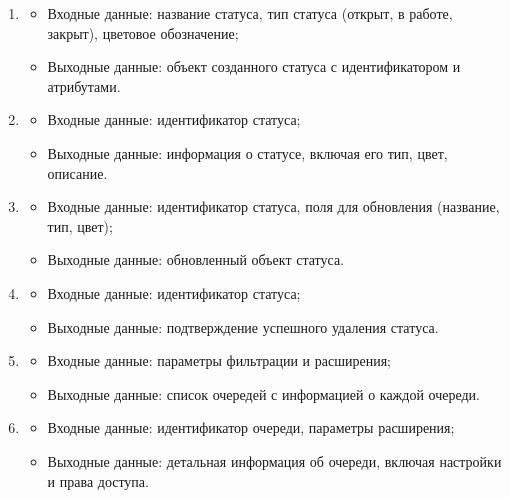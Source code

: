 \documentclass[utf8, russian]{eskdtext}
\begin{document}
\begin{enumerate}
    \item {}
    \begin{itemize}
        \item Входные данные: название статуса, тип статуса (открыт, в работе, закрыт), цветовое обозначение;
        \item Выходные данные: объект созданного статуса с идентификатором и атрибутами.
    \end{itemize}
    
    \item {}
    \begin{itemize}
        \item Входные данные: идентификатор статуса;
        \item Выходные данные: информация о статусе, включая его тип, цвет, описание.
    \end{itemize}
    
    \item {}
    \begin{itemize}
        \item Входные данные: идентификатор статуса, поля для обновления (название, тип, цвет);
        \item Выходные данные: обновленный объект статуса.
    \end{itemize}
    
    \item {}
    \begin{itemize}
        \item Входные данные: идентификатор статуса;
        \item Выходные данные: подтверждение успешного удаления статуса.
    \end{itemize}
    
    \item {}
    \begin{itemize}
        \item Входные данные: параметры фильтрации и расширения;
        \item Выходные данные: список очередей с информацией о каждой очереди.
    \end{itemize}
    
    \item {}
    \begin{itemize}
        \item Входные данные: идентификатор очереди, параметры расширения;
        \item Выходные данные: детальная информация об очереди, включая настройки и права доступа.
    \end{itemize}
    

\end{enumerate}
\end{document}
